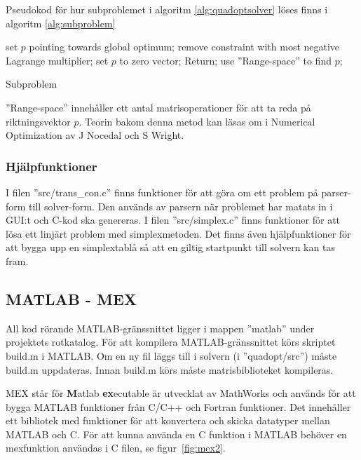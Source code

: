 \noindent Pseudokod för hur subproblemet i algoritm \ref{alg:quadoptsolver} löses finns i algoritm \ref{alg:subproblem}

\begin{algorithm}[H]

\begin{algorithmic}
\State set $p$ pointing towards global optimum;
\Else
{}
\State remove constraint with most negative Lagrange multiplier;
\State set $p$ to zero vector;
\State Return;
\EndIf
\EndWhile
\State use ''Range-space'' to find $p$;
\EndIf
\EndProcedure
\end{algorithmic}

\caption{Subproblem}
\label{alg:subproblem}
\end{algorithm}

\noindent ''Range-space'' innehåller ett antal matrisoperationer för att ta reda på riktningsvektor $p$. Teorin bakom denna metod kan läsas om i Numerical Optimization av J Nocedal och S Wright.

\subsubsection{Hjälpfunktioner} \label{sec:helpfun}
I filen ''src/trans\_con.c'' finns funktioner för att göra om ett problem på parser-form till solver-form. Den används av parsern när problemet har matats in i GUI:t och C-kod ska genereras.
\newline
\newline
I filen ''src/simplex.c'' finns funktioner för att lösa ett linjärt problem med simplexmetoden. Det finns även hjälpfunktioner för att bygga upp en simplextablå så att en giltig startpunkt till solvern kan tas fram. 

\subsection{MATLAB - MEX} \label{subsec:mex}
All kod rörande MATLAB-gränssnittet ligger i mappen ''matlab'' under projektets rotkatalog. För att kompilera MATLAB-gränssnittet körs skriptet build.m i MATLAB. Om en ny fil läggs till i solvern (i ''quadopt/src'') måste build.m uppdateras. Innan build.m körs måste matrisbiblioteket kompileras.

MEX står för \textbf{M}atlab \textbf{ex}ecutable är utvecklat av MathWorks och används för att bygga MATLAB funktioner från C/C++ och Fortran funktioner. Det innehåller ett bibliotek med funktioner för att konvertera och skicka datatyper mellan MATLAB och C. För att kunna använda en C funktion i MATLAB behöver en mexfunktion användas i C filen, se figur~\ref{fig:mex2}. 


